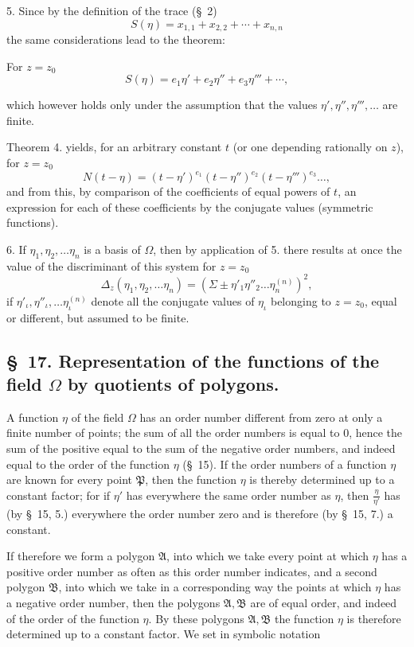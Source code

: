 \documentclass{article}
\begin{document}
5. Since by the definition of the trace (§~2)
\[ S(\eta) = x_{1,1} + x_{2,2} + \cdots + x_{n,n} \]
the same considerations lead to the theorem:

For $z = z_{0}$
\[ S(\eta) = e_{1}\eta' + e_{2}\eta'' + e_{3}\eta''' + \cdots, \]

which however holds only under the assumption that the values $\eta', \eta'', \eta''', \ldots$ are finite.

Theorem 4. yields, for an arbitrary constant $t$ (or one depending rationally on $z$), for $z = z_{0}$
\[ N(t-\eta) = (t-\eta')^{e_{1}}(t-\eta'')^{e_{2}}(t-\eta''')^{e_{3}}\ldots, \]
and from this, by comparison of the coefficients of equal powers of $t$, an expression for each of these coefficients by the conjugate values (symmetric functions).

6. If $\eta_{1}, \eta_{2}, \ldots \eta_{n}$ is a basis of $\Omega$, then by application of 5. there results at once the value of the discriminant of this system for $z = z_{0}$
\[ \Delta_{z}(\eta_{1}, \eta_{2}, \ldots \eta_{n}) = (\Sigma \pm \eta'_{1}\eta''_{2}\ldots\eta_{n}^{(n)})^{2}, \]
if $\eta'_{\iota}, \eta''_{\iota}, \ldots \eta_{\iota}^{(n)}$ denote all the conjugate values of $\eta_{\iota}$ belonging to $z = z_{0}$, equal or different, but assumed to be finite.

\subsection*{§~17. Representation of the functions of the field $\Omega$ by quotients of polygons.}

A function $\eta$ of the field $\Omega$ has an order number different from zero at only a finite number of points; the sum of all the order numbers is equal to 0, hence the sum of the positive equal to the sum of the negative order numbers, and indeed equal to the order of the function $\eta$ (§~15). If the order numbers of a function $\eta$ are known for every point $\mathfrak{P}$, then the function $\eta$ is thereby determined up to a constant factor; for if $\eta'$ has everywhere the same order number as $\eta$, then $\frac{\eta}{\eta'}$ has (by §~15, 5.) everywhere the order number zero and is therefore (by §~15, 7.) a constant.

If therefore we form a polygon $\mathfrak{A}$, into which we take every point at which $\eta$ has a positive order number as often as this order number indicates, and a second polygon $\mathfrak{B}$, into which we take in a corresponding way the points at which $\eta$ has a negative order number, then the polygons $\mathfrak{A}, \mathfrak{B}$ are of equal order, and indeed of the order of the function $\eta$. By these polygons $\mathfrak{A}, \mathfrak{B}$ the function $\eta$ is therefore determined up to a constant factor. We set in symbolic notation
\end{document}
